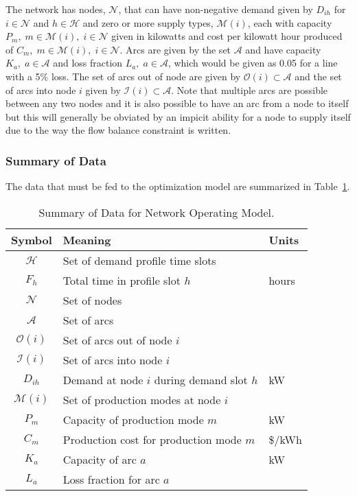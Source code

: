 \documentclass[11pt]{article}
\begin{document}
The network has nodes, $\mathcal{N}$, that can have non-negative demand given by $D_{ih}$ for $i \in \mathcal{N}$ and $h \in \mathcal{H}$ and zero or more supply types, $\mathcal{M}(i)$, each with capacity $P_{m},\; m \in \mathcal{M}(i), \; i \in \mathcal{N}$ given in kilowatts and cost per kilowatt hour produced of $C_{m},\; m \in \mathcal{M}(i), \; i \in \mathcal{N}$. Arcs are given by the set $\mathcal{A}$ and have capacity $K_{a}, \; a \in \mathcal{A}$ and loss fraction $L_{a}, \; a \in \mathcal{A}$, which would be given as 0.05 for a line with a 5\% loss. The set of arcs out of node are given by $\mathcal{O}(i) \subset \mathcal{A}$ and
the set of arcs into node $i$ given by $\mathcal{I}(i) \subset \mathcal{A}$. Note that multiple arcs are possible between any two nodes and it is also
possible to have an arc from a node to itself but this will generally be obviated by an impicit ability for a node to supply itself due to the way the flow balance constraint is written.

\subsubsection{Summary of Data}

The data that must be fed to the optimization model are summarized in Table~\ref{tab:OpDataNeeds}.

\begin{table}[!htbp] \caption{Summary of Data for Network Operating Model.\label{tab:OpDataNeeds}}
\centering 
\begin{tabular}{||c|l|l||}
\hline \hline
Symbol & Meaning & Units \\
\hline
$\mathcal{H}$ & Set of demand profile time slots & \\
$F_h$ & Total time in profile slot $h$ & hours \\
$\mathcal{N}$ & Set of nodes & \\
$\mathcal{A}$ & Set of arcs & \\
$\mathcal{O}(i)$ & Set of arcs out of node $i$ & \\
$\mathcal{I}(i)$ & Set of arcs into node $i$ & \\
$D_{ih}$ & Demand at node $i$ during demand slot $h$ & kW \\
$\mathcal{M}(i)$ & Set of production modes at node $i$ & \\
$P_m$ & Capacity of production mode $m$ & kW \\
$C_m$ & Production cost for production mode $m$ & \$/kWh \\
$K_a$ & Capacity of arc $a$ & kW \\
$L_a$ & Loss fraction for arc $a$ & \\
\hline \hline
\end{tabular}
\end{table}
\end{document}
